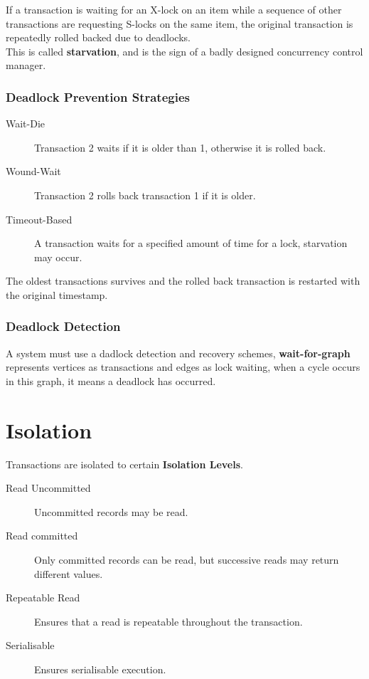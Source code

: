 \documentclass[11pt,a4paper,twocolumn]{book}
\begin{document}
If a transaction is waiting for an X-lock on an item while a sequence of other transactions are requesting S-locks on the same item, the original transaction is repeatedly rolled backed due to deadlocks.\\

This is called \textbf{starvation}, and is the sign of a badly designed concurrency control manager.

\subsubsection{Deadlock Prevention Strategies}

\begin{description}
\item[Wait-Die] Transaction 2 waits if it is older than 1, otherwise it is rolled back.
\item[Wound-Wait] Transaction 2 rolls back transaction 1 if it is older.
\item[Timeout-Based] A transaction waits for a specified amount of time for a lock, starvation may occur.
\end{description}

The oldest transactions survives and the rolled back transaction is restarted with the original timestamp.

\subsubsection{Deadlock Detection}

A system must use a dadlock detection and recovery schemes, \textbf{wait-for-graph} represents vertices as transactions and edges as lock waiting, when a cycle occurs in this graph, it means a deadlock has occurred.

\section{Isolation}

Transactions are isolated to certain \textbf{Isolation Levels}.

\begin{description}
\item[Read Uncommitted] Uncommitted records may be read.
\item[Read committed] Only committed records can be read, but successive reads may return different values.
\item[Repeatable Read] Ensures that a read is repeatable throughout the transaction.
\item[Serialisable] Ensures serialisable execution.
\end{description}
\end{document}
